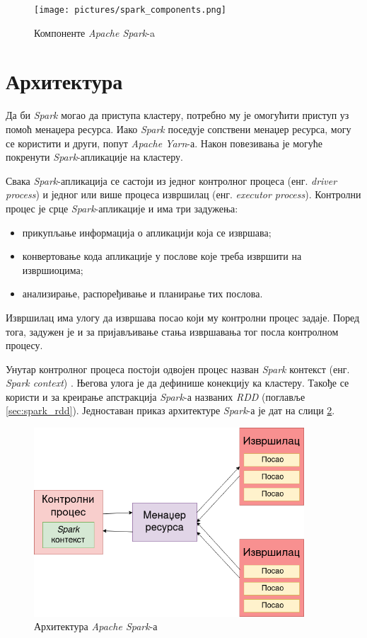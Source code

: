 \documentclass[12pt,oneside]{memoir}
\begin{document}
\begin{figure}[!ht]
  \centering
  \texttt{[image: pictures/spark\_components.png]}
  \caption{Компоненте \textit{Apache Spark}-a}
  \label{fig:spark_kompot}
\end{figure}

\section{Архитектура}
\label{sec:spark_arx}

Да би \textit{Spark} могао да приступа кластеру, потребно му је омогућити приступ уз помоћ менаџера ресурса. Иако \textit{Spark} поседује сопствени менаџер ресурса, могу се користити и други, попут \textit{Apache Yarn}-а. Након повезивања је могуће покренути \textit{Spark}-апликације на кластеру. 

Свака \textit{Spark}-апликација се састоји из једног контролног процеса (енг. \textit{driver process}) и једног или више процеса извршилац (енг. \textit{executor process}). Контролни процес је срце \textit{Spark}-апликације и има три задужења:

\begin{itemize}
	\item прикупљање информација о апликацији која се извршава;	
	\item конвертовање кода апликације у послове које треба извршити на извршиоцима;
	\item анализирање, распоређивање и планирање тих послова.
\end{itemize}

Извршилац има улогу да извршава посао који му контролни процес задаје. Поред тога, задужен је и за пријављивање стања извршавања тог посла контролном процесу. 

Унутар контролног процеса постоји одвојен процес назван \textit{Spark} контекст (енг. \textit{Spark context}) \cite{spark_guide}. Његова улога је да дефинише конекцију ка кластеру. Такође се користи и за креирање апстракција \textit{Spark}-а названих \textit{RDD} (поглавље \ref{sec:spark_rdd}). Једноставан приказ архитектуре \textit{Spark}-а је дат на слици \ref{fig:spark_arhtt}.

\begin{figure}[!ht]
  \centering
  \includegraphics[width=0.90\textwidth]{pictures/spark_arch.png}
  \caption{Архитектура \textit{Apache Spark}-а}
  \label{fig:spark_arhtt}
\end{figure}
\end{document}
